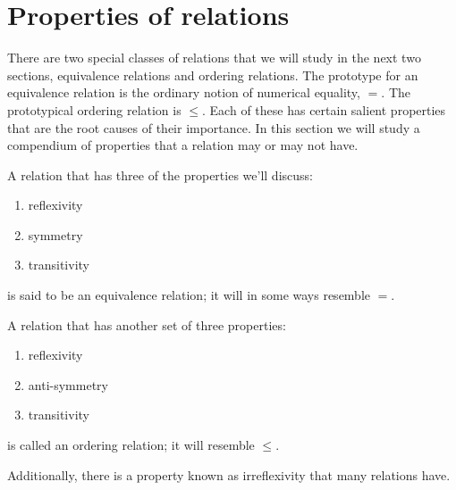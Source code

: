 \documentclass[10pt,]{book}
\theoremstyle{plain}
\theoremstyle{definition}
\theoremstyle{definition}
\numberwithin{equation}{section}
\begin{document}
\section[{Properties of relations}]{Properties of relations}\label{section-31}

    There are two special classes of relations that we will study
    in the next two sections, equivalence relations and ordering relations.
    The prototype for an equivalence relation is the ordinary notion
    of numerical equality, \(=\). The prototypical ordering relation
    is \(\leq\). Each of these has certain salient properties that are the
    root causes of their importance. In this section we will study a
    compendium of properties that a relation may or may not have.
\par

  A relation that has three of the properties we'll discuss:

  \leavevmode%
\begin{enumerate}
\item\hypertarget{li-398}{}
         reflexivity
\item\hypertarget{li-399}{}
        symmetry
\item\hypertarget{li-400}{}
        transitivity
\end{enumerate}

\par

    is said to be an equivalence relation; it will in some ways resemble
    \(=\).
\par

  A relation that has another set of three properties:

  \leavevmode%
\begin{enumerate}
\item\hypertarget{li-401}{}
        reflexivity
\item\hypertarget{li-402}{}
        anti-symmetry
\item\hypertarget{li-403}{}
        transitivity
\end{enumerate}

\par

    is called an ordering relation; it will resemble \(\leq\).
\par

    Additionally, there is a property known as irreflexivity that many
    relations have.
\par
\end{document}
